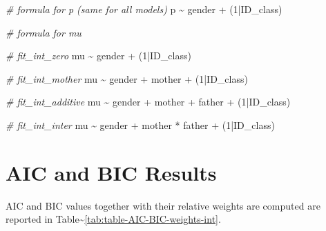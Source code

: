 \documentclass[
]{book}
\newenvironment{Shaded}{\begin{snugshade}}{\end{snugshade}}
\newcommand{\CommentTok}[1]{\textcolor[rgb]{0.56,0.35,0.01}{\textit{#1}}}
\newcommand{\DecValTok}[1]{\textcolor[rgb]{0.00,0.00,0.81}{#1}}
\newcommand{\NormalTok}[1]{#1}
\newcommand{\SpecialCharTok}[1]{\textcolor[rgb]{0.00,0.00,0.00}{#1}}
\begin{document}
\begin{Shaded}
\begin{Highlighting}[]
\CommentTok{\# formula for p (same for all models)}
\NormalTok{p }\SpecialCharTok{\textasciitilde{}}\NormalTok{ gender }\SpecialCharTok{+}\NormalTok{ (}\DecValTok{1}\SpecialCharTok{|}\NormalTok{ID\_class)}

\CommentTok{\# formula for mu}

\CommentTok{\# fit\_int\_zero}
\NormalTok{mu }\SpecialCharTok{\textasciitilde{}}\NormalTok{ gender }\SpecialCharTok{+}\NormalTok{ (}\DecValTok{1}\SpecialCharTok{|}\NormalTok{ID\_class)}

\CommentTok{\# fit\_int\_mother}
\NormalTok{mu }\SpecialCharTok{\textasciitilde{}}\NormalTok{ gender }\SpecialCharTok{+}\NormalTok{ mother }\SpecialCharTok{+}\NormalTok{ (}\DecValTok{1}\SpecialCharTok{|}\NormalTok{ID\_class)}

\CommentTok{\# fit\_int\_additive}
\NormalTok{mu }\SpecialCharTok{\textasciitilde{}}\NormalTok{ gender }\SpecialCharTok{+}\NormalTok{ mother }\SpecialCharTok{+}\NormalTok{ father }\SpecialCharTok{+}\NormalTok{ (}\DecValTok{1}\SpecialCharTok{|}\NormalTok{ID\_class)}

\CommentTok{\# fit\_int\_inter}
\NormalTok{mu }\SpecialCharTok{\textasciitilde{}}\NormalTok{ gender }\SpecialCharTok{+}\NormalTok{ mother }\SpecialCharTok{*}\NormalTok{ father }\SpecialCharTok{+}\NormalTok{ (}\DecValTok{1}\SpecialCharTok{|}\NormalTok{ID\_class)}
\end{Highlighting}
\end{Shaded}

\hypertarget{aic-and-bic-results-1}{%
\section{AIC and BIC Results}\label{aic-and-bic-results-1}}

AIC and BIC values together with their relative weights are computed are reported in Table\textasciitilde\ref{tab:table-AIC-BIC-weights-int}.
\end{document}

